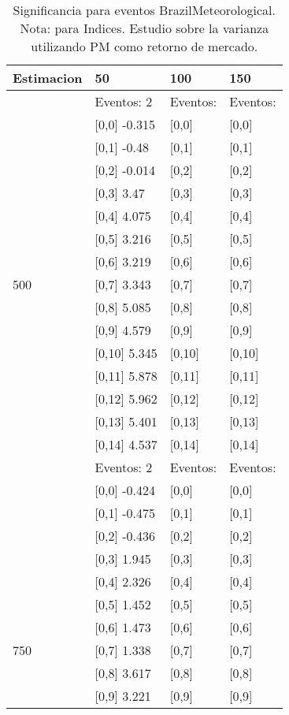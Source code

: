 \begin{table}

\caption{Significancia para eventos BrazilMeteorological. Nota: para Indices. Estudio sobre la varianza utilizando PM como retorno de mercado.}
\centering
\begin{tabular}[t]{llll}
\toprule
Estimacion & 50 & 100 & 150\\
\midrule
 & Eventos:  2 & Eventos: & Eventos:\\
 & {}[0,0] -0.315 & {}[0,0] & {}[0,0]\\
 & {}[0,1] -0.48 & {}[0,1] & {}[0,1]\\
 & {}[0,2] -0.014 & {}[0,2] & {}[0,2]\\
 & {}[0,3] 3.47 & {}[0,3] & {}[0,3]\\
\addlinespace
 & {}[0,4] 4.075 & {}[0,4] & {}[0,4]\\
 & {}[0,5] 3.216 & {}[0,5] & {}[0,5]\\
 & {}[0,6] 3.219 & {}[0,6] & {}[0,6]\\
500 & {}[0,7] 3.343 & {}[0,7] & {}[0,7]\\
 & {}[0,8] 5.085 & {}[0,8] & {}[0,8]\\
\addlinespace
 & {}[0,9] 4.579 & {}[0,9] & {}[0,9]\\
 & {}[0,10] 5.345 & {}[0,10] & {}[0,10]\\
 & {}[0,11] 5.878 & {}[0,11] & {}[0,11]\\
 & {}[0,12] 5.962 & {}[0,12] & {}[0,12]\\
 & {}[0,13] 5.401 & {}[0,13] & {}[0,13]\\
\addlinespace
 & {}[0,14] 4.537 & {}[0,14] & {}[0,14]\\
 & Eventos:  2 & Eventos: & Eventos:\\
 & {}[0,0] -0.424 & {}[0,0] & {}[0,0]\\
 & {}[0,1] -0.475 & {}[0,1] & {}[0,1]\\
 & {}[0,2] -0.436 & {}[0,2] & {}[0,2]\\
\addlinespace
 & {}[0,3] 1.945 & {}[0,3] & {}[0,3]\\
 & {}[0,4] 2.326 & {}[0,4] & {}[0,4]\\
 & {}[0,5] 1.452 & {}[0,5] & {}[0,5]\\
 & {}[0,6] 1.473 & {}[0,6] & {}[0,6]\\
750 & {}[0,7] 1.338 & {}[0,7] & {}[0,7]\\
\addlinespace
 & {}[0,8] 3.617 & {}[0,8] & {}[0,8]\\
 & {}[0,9] 3.221 & {}[0,9] & {}[0,9]\\

\end{tabular}
\end{table}
